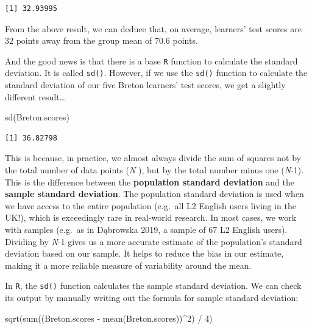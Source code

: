 \documentclass[
  letterpaper,
  DIV=11,
  numbers=noendperiod]{scrreprt}
\newenvironment{Shaded}{\begin{snugshade}}{\end{snugshade}}
\newcommand{\DecValTok}[1]{\textcolor[rgb]{0.68,0.00,0.00}{#1}}
\newcommand{\FunctionTok}[1]{\textcolor[rgb]{0.28,0.35,0.67}{#1}}
\newcommand{\NormalTok}[1]{\textcolor[rgb]{0.00,0.23,0.31}{#1}}
\newcommand{\SpecialCharTok}[1]{\textcolor[rgb]{0.37,0.37,0.37}{#1}}
\begin{document}
\begin{verbatim}
[1] 32.93995
\end{verbatim}

From the above result, we can deduce that, on average, learners' test
scores are 32 points away from the group mean of 70.6 points.

And the good news is that there is a base \texttt{R} function to
calculate the standard deviation. It is called \texttt{sd()}. However,
if we use the \texttt{sd()} function to calculate the standard deviation
of our five Breton learners' test scores, we get a slightly different
result\ldots~

\begin{Shaded}
\begin{Highlighting}[]
\FunctionTok{sd}\NormalTok{(Breton.scores)}
\end{Highlighting}
\end{Shaded}

\begin{verbatim}
[1] 36.82798
\end{verbatim}

This is because, in practice, we almost always divide the sum of squares
not by the total number of data points (\emph{N} ), but by the total
number minus one (\emph{N}-1). This is the difference between the
\textbf{population standard deviation} and the \textbf{sample standard
deviation}. The population standard deviation is used when we have
access to the entire population (e.g.~all L2 English users living in the
UK!), which is exceedingly rare in real-world research. In most cases,
we work with samples (e.g.~as in Dąbrowska 2019, a sample of 67 L2
English users). Dividing by \emph{N}-1 gives us a more accurate estimate
of the population's standard deviation based on our sample. It helps to
reduce the bias in our estimate, making it a more reliable measure of
variability around the mean.

In \texttt{R}, the \texttt{sd()} function calculates the sample standard
deviation. We can check its output by manually writing out the formula
for sample standard deviation:

\begin{Shaded}
\begin{Highlighting}[]
\FunctionTok{sqrt}\NormalTok{(}\FunctionTok{sum}\NormalTok{((Breton.scores }\SpecialCharTok{{-}} \FunctionTok{mean}\NormalTok{(Breton.scores))}\SpecialCharTok{\^{}}\DecValTok{2}\NormalTok{) }\SpecialCharTok{/} \DecValTok{4}\NormalTok{)}
\end{Highlighting}
\end{Shaded}
\end{document}
